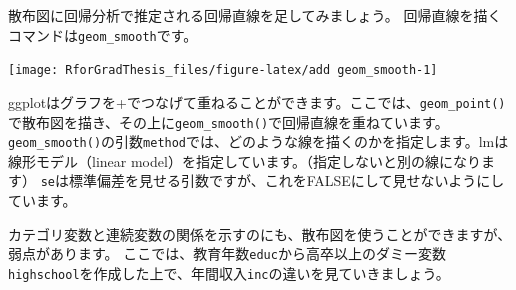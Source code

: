 \documentclass[]{book}
\newenvironment{Shaded}{\begin{snugshade}}{\end{snugshade}}
\newcommand{\KeywordTok}[1]{\textcolor[rgb]{0.13,0.29,0.53}{\textbf{#1}}}
\newcommand{\DataTypeTok}[1]{\textcolor[rgb]{0.13,0.29,0.53}{#1}}
\newcommand{\DecValTok}[1]{\textcolor[rgb]{0.00,0.00,0.81}{#1}}
\newcommand{\StringTok}[1]{\textcolor[rgb]{0.31,0.60,0.02}{#1}}
\newcommand{\OtherTok}[1]{\textcolor[rgb]{0.56,0.35,0.01}{#1}}
\newcommand{\OperatorTok}[1]{\textcolor[rgb]{0.81,0.36,0.00}{\textbf{#1}}}
\newcommand{\NormalTok}[1]{#1}
\begin{document}
散布図に回帰分析で推定される回帰直線を足してみましょう。
回帰直線を描くコマンドは\texttt{geom\_smooth}です。

\begin{Shaded}
\end{Shaded}

\begin{center}\texttt{[image: RforGradThesis\_files/figure-latex/add geom\_smooth-1]} \end{center}

ggplotはグラフを+でつなげて重ねることができます。ここでは、\texttt{geom\_point()}で散布図を描き、その上に\texttt{geom\_smooth()}で回帰直線を重ねています。
\texttt{geom\_smooth()}の引数\texttt{method}では、どのような線を描くのかを指定します。lmは線形モデル（linear
model）を指定しています。（指定しないと別の線になります）
\texttt{se}は標準偏差を見せる引数ですが、これをFALSEにして見せないようにしています。

カテゴリ変数と連続変数の関係を示すのにも、散布図を使うことができますが、弱点があります。
ここでは、教育年数\texttt{educ}から高卒以上のダミー変数\texttt{highschool}を作成した上で、年間収入\texttt{inc}の違いを見ていきましょう。

\begin{Shaded}
\end{Shaded}
\end{document}

